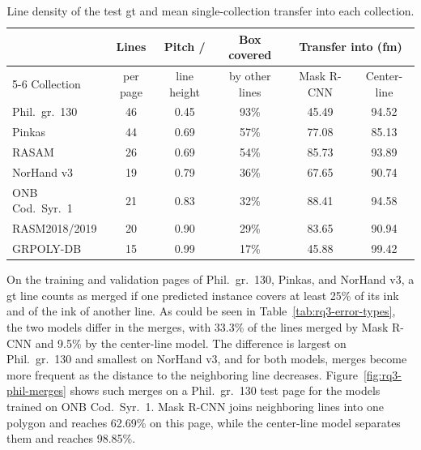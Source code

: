 \begin{table}[htbp]
    \centering
    \scriptsize
    \setlength{\tabcolsep}{4pt}
    \caption{Line density of the test \gls{gt} and mean single-collection transfer into each collection.}
    \label{tab:rq3-line-density}
    \begin{tabular*}{\textwidth}{@{\extracolsep{\fill}}lccccc@{}}
        \toprule
        & Lines & Pitch / & Box covered & \multicolumn{2}{c}{Transfer into (\gls{fm})} \\
        \cmidrule(l){5-6}
        Collection & per page & line height & by other lines & Mask R-CNN & Center-line \\
        \midrule
        Phil.\ gr.\ 130 & 46 & 0.45 & 93\% & 45.49 & 94.52 \\
        Pinkas & 44 & 0.69 & 57\% & 77.08 & 85.13 \\
        RASAM & 26 & 0.69 & 54\% & 85.73 & 93.89 \\
        NorHand v3 & 19 & 0.79 & 36\% & 67.65 & 90.74 \\
        ONB Cod.\ Syr.\ 1 & 21 & 0.83 & 32\% & 88.41 & 94.58 \\
        RASM2018/2019 & 20 & 0.90 & 29\% & 83.65 & 90.94 \\
        GRPOLY-DB & 15 & 0.99 & 17\% & 45.88 & 99.42 \\
        \bottomrule
    \end{tabular*}
\end{table}

On the training and validation pages of Phil.\ gr.\ 130, Pinkas, and NorHand v3, a \gls{gt} line counts as merged if one predicted instance covers at least 25\% of its ink and of the ink of another line. As could be seen in Table~\ref{tab:rq3-error-types}, the two models differ in the merges, with 33.3\% of the lines merged by Mask R-CNN and 9.5\% by the center-line model. The difference is largest on Phil.\ gr.\ 130 and smallest on NorHand v3, and for both models, merges become more frequent as the distance to the neighboring line decreases. Figure~\ref{fig:rq3-phil-merges} shows such merges on a Phil.\ gr.\ 130 test page for the models trained on ONB Cod.\ Syr.\ 1. Mask R-CNN joins neighboring lines into one polygon and reaches 62.69\% on this page, while the center-line model separates them and reaches 98.85\%.

